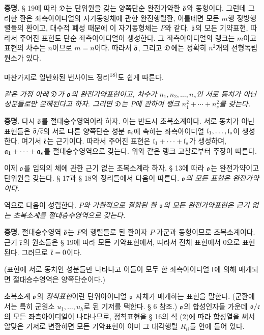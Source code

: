 \textbf{증명.} § 19에 따라 \(\mathfrak{D}\)는 단위원을 갖는 양쪽단순 완전가약환 \(\bar{\mathfrak o}\)와 동형이다. 그런데 그러한 환은 좌측아이디얼의 자기동형체에 관한 완전행렬환, 이를테면 모든 \(m\)행 정방행렬들의 환이고, 대수적 폐성 때문에 이 자기동형체는 \(P\)와 같다. \(\bar{\mathfrak o}\)의 모든 기약표현, 따라서 주어진 표현도 단순 좌측아이디얼이 생성한다. 그 좌측아이디얼의 랭크는 \(m\)이고 표현의 차수는 \(n\)이므로 \(m=n\)이다. 따라서 \(\bar{\mathfrak o}\), 그리고 \(\mathfrak{D}\)에는 정확히 \(n^2\)개의 선형독립 원소가 있다.

마찬가지로 \glqq{}일반화된 번사이드 정리\grqq{}\textsuperscript{18)}도 쉽게 따른다.

\emph{같은 가정 아래 \(\mathfrak{D}\)가 \(\mathfrak o\)의 완전가약표현이고, 차수가 \(n_1,n_2,\ldots,n_s\)인 서로 동치가 아닌 성분들로만 분해된다고 하자. 그러면 \(\mathfrak{D}\)는 \(P\)에 관하여 랭크 \(n_1^2+\cdots+n_s^2\)를 갖는다.}

\textbf{증명.} 다시 \(\bar{\mathfrak o}\)를 절대승수영역이라 하자. 이는 반드시 초복소계이다. 서로 동치가 아닌 표현들은 \(\bar{\mathfrak o}/\bar{\mathfrak c}\)의 서로 다른 양쪽단순 성분 \(\mathfrak{a}_i\)에 속하는 좌측아이디얼 \(\mathfrak l_1,\ldots,\mathfrak l_s\)이 생성한다. 여기서 \(\bar{\mathfrak c}\)는 근기이다. 따라서 주어진 표현은 \(\mathfrak l_1+\cdots+\mathfrak l_s\)가 생성하며, \(\mathfrak{a}_1+\cdots+\mathfrak{a}_s\)를 절대승수영역으로 갖는다. 위와 같은 랭크 고찰로부터 주장이 따른다.

이제 \(\mathfrak o\)를 임의의 체에 관한 근기 없는 초복소계라 하자. § 13에 따라 \(\mathfrak o\)는 완전가약이고 단위원을 갖는다. § 17과 § 18의 정리들에서 다음이 따른다. \emph{\(\mathfrak o\)의 모든 표현은 완전가약이다.}

역으로 다음이 성립한다. \emph{\(P\)와 가환적으로 결합된 환 \(\mathfrak o\)의 모든 완전가약표현은 근기 없는 초복소계를 절대승수영역으로 갖는다.}

\textbf{증명.} 절대승수영역 \(\bar{\mathfrak o}\)는 \(P\)의 행렬들로 된 환이자 \(P\)-가군과 동형이므로 초복소계이다. 근기 \(\bar{\mathfrak c}\)의 원소들은 § 19에 따라 모든 기약표현에서, 따라서 전체 표현에서 0으로 표현된다. 그러므로 \(\bar{\mathfrak c}=0\)이다.

(표현에 서로 동치인 성분들만 나타나고 이들이 모두 한 좌측아이디얼 \(\mathfrak l\)에 의해 매개되면 절대승수영역은 양쪽단순이다.)

초복소계 \(\mathfrak o\)의 \emph{정칙표현}이란 단위아이디얼 \(\mathfrak o\) 자체가 매개하는 표현을 말한다. (군환에서는 특히 군원소 \(u_1,\ldots,u_h\)로 된 기저를 택한다. § 6 참조.) \(\mathfrak o\)의 합성인자들 가운데 \(\mathfrak o/\mathfrak c\)의 모든 좌측아이디얼이 나타나므로, 정칙표현을 § 16의 식 (2)에 따라 합성열을 써서 알맞은 기저로 변환하면 모든 기약표현이 이미 그 대각행렬 \(R_{ii}\)들 안에 들어 있다.

